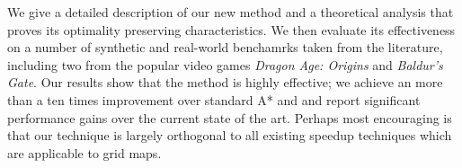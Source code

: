 We give a detailed description of our new method and a theoretical analysis that
proves its optimality preserving characteristics.  We then evaluate its
effectiveness on a number of synthetic and real-world benchamrks taken from the
literature, including two from the popular video games \emph{Dragon Age:
Origins} and \emph{Baldur's Gate}.  Our results show that the method is highly
effective; we achieve an more than a ten times improvement over standard A* and
and report significant performance gains over the current state of the art.
Perhaps most encouraging is that our technique is largely orthogonal to all
existing speedup techniques which are applicable to grid maps.

% 
